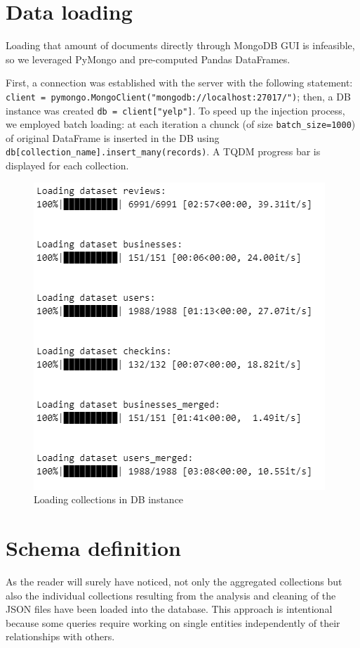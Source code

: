 \documentclass{Configuration_Files/PoliMi3i_thesis}
\begin{document}
\section{Data loading}
Loading that amount of documents directly through MongoDB GUI is infeasible, so we leveraged PyMongo and pre-computed Pandas DataFrames. 

First, a connection was established with the server with the following statement: \\
\verb|client = pymongo.MongoClient("mongodb://localhost:27017/")|; then, a DB instance was created \verb|db = client["yelp"]|. 
To speed up the injection process, we employed batch loading: at each iteration a chunck (of size \texttt{batch\_size=1000}) of original DataFrame is inserted in the DB using \texttt{db[collection\_name].insert\_many(records)}. A TQDM progress bar is displayed for each collection.
\begin{figure}[H]
    \centering
    \includegraphics[width=1\columnwidth / 2]{imgs/injection_process.png}
    \caption{Loading collections in DB instance}
    \label{fig:injection_process}
\end{figure}

\section{Schema definition}
As the reader will surely have noticed, not only the aggregated collections but also the individual collections resulting from the analysis and cleaning of the JSON files have been loaded into the database. This approach is intentional because some queries require working on single entities independently of their relationships with others.
\end{document}
